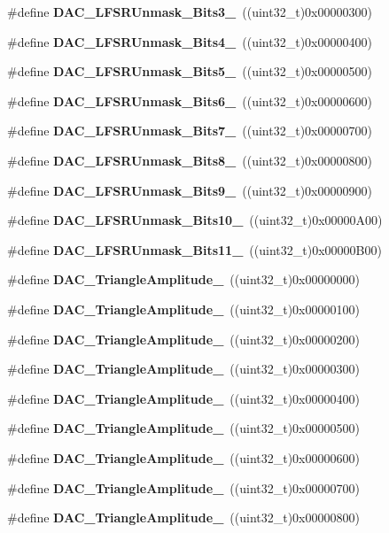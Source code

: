 \begin{DoxyCompactItemize}
\item 
\#define \textbf{ D\+A\+C\+\_\+\+L\+F\+S\+R\+Unmask\+\_\+\+Bits3\+\_}~((uint32\+\_\+t)0x00000300)
\item 
\#define \textbf{ D\+A\+C\+\_\+\+L\+F\+S\+R\+Unmask\+\_\+\+Bits4\+\_}~((uint32\+\_\+t)0x00000400)
\item 
\#define \textbf{ D\+A\+C\+\_\+\+L\+F\+S\+R\+Unmask\+\_\+\+Bits5\+\_}~((uint32\+\_\+t)0x00000500)
\item 
\#define \textbf{ D\+A\+C\+\_\+\+L\+F\+S\+R\+Unmask\+\_\+\+Bits6\+\_}~((uint32\+\_\+t)0x00000600)
\item 
\#define \textbf{ D\+A\+C\+\_\+\+L\+F\+S\+R\+Unmask\+\_\+\+Bits7\+\_}~((uint32\+\_\+t)0x00000700)
\item 
\#define \textbf{ D\+A\+C\+\_\+\+L\+F\+S\+R\+Unmask\+\_\+\+Bits8\+\_}~((uint32\+\_\+t)0x00000800)
\item 
\#define \textbf{ D\+A\+C\+\_\+\+L\+F\+S\+R\+Unmask\+\_\+\+Bits9\+\_}~((uint32\+\_\+t)0x00000900)
\item 
\#define \textbf{ D\+A\+C\+\_\+\+L\+F\+S\+R\+Unmask\+\_\+\+Bits10\+\_}~((uint32\+\_\+t)0x00000\+A00)
\item 
\#define \textbf{ D\+A\+C\+\_\+\+L\+F\+S\+R\+Unmask\+\_\+\+Bits11\+\_}~((uint32\+\_\+t)0x00000\+B00)
\item 
\#define \textbf{ D\+A\+C\+\_\+\+Triangle\+Amplitude\+\_}~((uint32\+\_\+t)0x00000000)
\item 
\#define \textbf{ D\+A\+C\+\_\+\+Triangle\+Amplitude\+\_}~((uint32\+\_\+t)0x00000100)
\item 
\#define \textbf{ D\+A\+C\+\_\+\+Triangle\+Amplitude\+\_}~((uint32\+\_\+t)0x00000200)
\item 
\#define \textbf{ D\+A\+C\+\_\+\+Triangle\+Amplitude\+\_}~((uint32\+\_\+t)0x00000300)
\item 
\#define \textbf{ D\+A\+C\+\_\+\+Triangle\+Amplitude\+\_}~((uint32\+\_\+t)0x00000400)
\item 
\#define \textbf{ D\+A\+C\+\_\+\+Triangle\+Amplitude\+\_}~((uint32\+\_\+t)0x00000500)
\item 
\#define \textbf{ D\+A\+C\+\_\+\+Triangle\+Amplitude\+\_}~((uint32\+\_\+t)0x00000600)
\item 
\#define \textbf{ D\+A\+C\+\_\+\+Triangle\+Amplitude\+\_}~((uint32\+\_\+t)0x00000700)
\item 
\#define \textbf{ D\+A\+C\+\_\+\+Triangle\+Amplitude\+\_}~((uint32\+\_\+t)0x00000800)
\item 

\end{DoxyCompactItemize}
